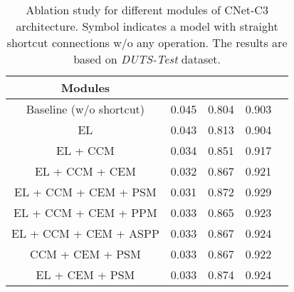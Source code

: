 \documentclass[10pt,twocolumn,letterpaper]{article}
\begin{document}
\begin{table}
\begin{center}
\begin{tabular}{|c|c|c|c|c|}
\hline
Modules &  &  &  \\
\hline\hline
Baseline (w/o shortcut) & 0.045 & 0.804 & 0.903 \\
EL & 0.043 & 0.813 & 0.904 \\
EL + CCM & 0.034 & 0.851 & 0.917 \\
EL + CCM + CEM & 0.032 & 0.867 & 0.921 \\
EL + CCM + CEM + PSM & 0.031 & 0.872 & 0.929 \\
\hline\rule{0pt}{2.2ex}
EL + CCM + CEM + PPM & 0.033 & 0.865 & 0.923 \\
EL + CCM + CEM + ASPP & 0.033 & 0.867 & 0.924 \\
\hline\rule{0pt}{2.2ex}
CCM + CEM + PSM & 0.033 & 0.867 & 0.922 \\
EL + CEM + PSM & 0.033 & 0.874 & 0.924 \\
\hline
\end{tabular}
\end{center}
\caption{Ablation study for different modules of CNet-C3 architecture. Symbol  indicates a model with straight shortcut connections w/o any operation. The results are based on \textit{DUTS-Test} dataset.}
\label{tab:modules_effectivness}
\end{table}
\end{document}

